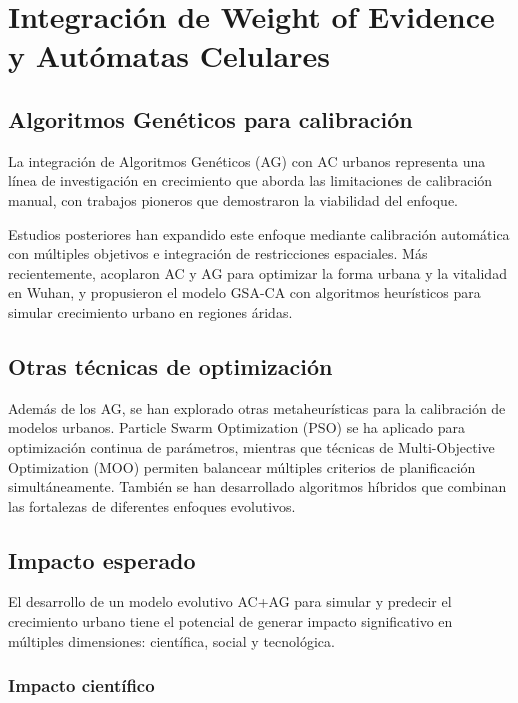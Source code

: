 \section{Integración de Weight of Evidence y Autómatas Celulares}

\subsection{Algoritmos Genéticos para calibración}

La integración de Algoritmos Genéticos (AG) con AC urbanos representa una línea de investigación en crecimiento que aborda las limitaciones de calibración manual, con trabajos pioneros que demostraron la viabilidad del enfoque.

Estudios posteriores han expandido este enfoque mediante calibración automática con múltiples objetivos e integración de restricciones espaciales. Más recientemente, \textcite{Wang2021} acoplaron AC y AG para optimizar la forma urbana y la vitalidad en Wuhan, y \textcite{Tang2024} propusieron el modelo GSA-CA con algoritmos heurísticos para simular crecimiento urbano en regiones áridas.

\subsection{Otras técnicas de optimización}

Además de los AG, se han explorado otras metaheurísticas para la calibración de modelos urbanos. Particle Swarm Optimization (PSO) se ha aplicado para optimización continua de parámetros, mientras que técnicas de Multi-Objective Optimization (MOO) permiten balancear múltiples criterios de planificación simultáneamente. También se han desarrollado algoritmos híbridos que combinan las fortalezas de diferentes enfoques evolutivos.

\subsection{Impacto esperado}

El desarrollo de un modelo evolutivo AC+AG para simular y predecir el crecimiento urbano tiene el potencial de generar impacto significativo en múltiples dimensiones: científica, social y tecnológica.

\subsubsection{Impacto científico}

